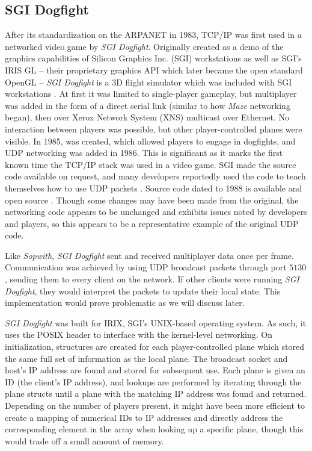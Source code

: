 \label{subsec:sgidogfight}

\subsection{SGI Dogfight}

After its standardization on the ARPANET in 1983, TCP/IP was first used in a networked video game by \textit{SGI Dogfight}. Originally created as a demo of the graphics capabilities of Silicon Graphics Inc. (SGI) workstations as well as SGI's IRIS GL -- their proprietary graphics API which later became the open standard OpenGL -- \textit{SGI Dogfight} is a 3D flight simulator which was included with SGI workstations \cite{zyda}. At first it was limited to single-player gameplay, but multiplayer was added in the form of a direct serial link (similar to how \textit{Maze} networking began), then over Xerox Network System (XNS) multicast over Ethernet. No interaction between players was possible, but other player-controlled planes were visible. In 1985,  was created, which allowed players to engage in dogfights, and UDP networking was added in 1986. This is significant as it marks the first known time the TCP/IP stack was used in a video game. SGI made the source code available on request, and many developers reportedly used the code to teach themselves how to use UDP packets \cite{zyda}. Source code dated to 1988 is available and open source \cite{dogsrc}. Though some changes may have been made from the original, the networking code appears to be unchanged and exhibits issues noted by developers and players, so this appears to be a representative example of the original UDP code. 

Like \textit{Sopwith}, \textit{SGI Dogfight} sent and received multiplayer data once per frame. Communication was achieved by using UDP broadcast packets through port $5130$, sending them to every client on the network. If other clients were running \textit{SGI Dogfight}, they would interpret the packets to update their local state. This implementation would prove problematic as we will discuss later.

\textit{SGI Dogfight} was built for IRIX, SGI's UNIX-based operating system. As such, it uses the  POSIX header to interface with the kernel-level networking.
On initialization, structures are created for each player-controlled plane which stored the same full set of information as the local plane. The broadcast socket and host's IP address are found and stored for subsequent use. Each plane is given an ID (the client's IP address), and lookups are performed by iterating through the plane structs until a plane with the matching IP address was found and returned. Depending on the number of players present, it might have been more efficient to create a mapping of numerical IDs to IP addresses and directly address the corresponding element in the array when looking up a specific plane, though this would trade off a small amount of memory.

